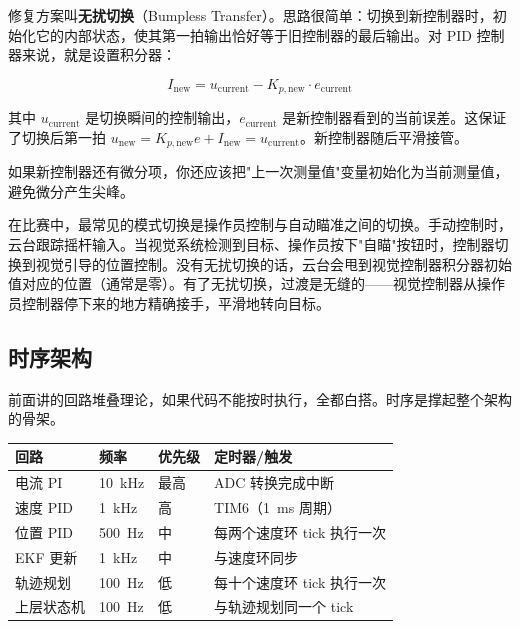 修复方案叫\textbf{无扰切换}（Bumpless Transfer）。思路很简单：切换到新控制器时，初始化它的内部状态，使其第一拍输出恰好等于旧控制器的最后输出。对 PID 控制器来说，就是设置积分器：

\begin{equation}
I_{\text{new}} = u_{\text{current}} - K_{p,\text{new}} \cdot e_{\text{current}}
\end{equation}

其中 $u_{\text{current}}$ 是切换瞬间的控制输出，$e_{\text{current}}$ 是新控制器看到的当前误差。这保证了切换后第一拍 $u_{\text{new}} = K_{p,\text{new}} e + I_{\text{new}} = u_{\text{current}}$。新控制器随后平滑接管。

如果新控制器还有微分项，你还应该把"上一次测量值"变量初始化为当前测量值，避免微分产生尖峰。

在比赛中，最常见的模式切换是操作员控制与自动瞄准之间的切换。手动控制时，云台跟踪摇杆输入。当视觉系统检测到目标、操作员按下"自瞄"按钮时，控制器切换到视觉引导的位置控制。没有无扰切换的话，云台会甩到视觉控制器积分器初始值对应的位置（通常是零）。有了无扰切换，过渡是无缝的——视觉控制器从操作员控制器停下来的地方精确接手，平滑地转向目标。

\subsection{时序架构}

前面讲的回路堆叠理论，如果代码不能按时执行，全都白搭。时序是撑起整个架构的骨架。

\begin{center}
\begin{tabular}{l l l l}
\hline
\textbf{回路} & \textbf{频率} & \textbf{优先级} & \textbf{定时器/触发} \\
\hline
电流 PI & 10~kHz & 最高 & ADC 转换完成中断 \\
速度 PID & 1~kHz & 高 & TIM6（1~ms 周期） \\
位置 PID & 500~Hz & 中 & 每两个速度环 tick 执行一次 \\
EKF 更新 & 1~kHz & 中 & 与速度环同步 \\
轨迹规划 & 100~Hz & 低 & 每十个速度环 tick 执行一次 \\
上层状态机 & 100~Hz & 低 & 与轨迹规划同一个 tick \\
\hline
\end{tabular}
\end{center}

